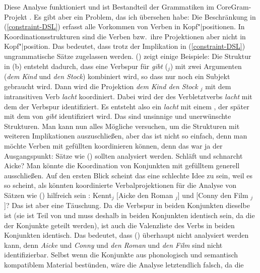 Diese Analyse funktioniert und ist Bestandteil der Grammatiken im CoreGram-Projekt
\citep{MuellerCoreGram}. Es gibt aber ein Problem, das ich übersehen habe: Die Beschränkung in
(\ref{constraint-DSL}) erfasst alle Vorkommen von Verben in Kopf"|positionen. In
Koordinationsstrukturen sind die Verben bzw.\ ihre Projektionen aber nicht in Kopf"|position. Das
bedeutet, dass trotz der Implikation in (\ref{constraint-DSL}) ungrammatische Sätze zugelassen
werden. () zeigt einige Beispiele:
\eal
\label{ex-Probleme bei zyklischen Verbspuren mit Koordination}
\zl
Die Struktur in (b) entsteht dadurch, dass eine Verbspur für \emph{gibt} (\trace$_j$) mit
zwei Argumenten (\emph{dem Kind} und \emph{den Stock}) kombiniert
wird, so dass nur noch ein Subjekt gebraucht wird. Dann wird die Projektion \emph{dem Kind den Stock
  \trace$_j$} mit dem intransitiven Verb \emph{lacht} koordiniert. Dabei wird der \dslw des
Verbletztverbs \emph{lacht} mit dem der Verbspur identifiziert. Es entsteht also ein \emph{lacht} mit einem
\dslw, der später mit dem \localw von \emph{gibt} identifiziert wird. Das sind unsinnige und unerwünschte
Strukturen. Man kann nun alles Mögliche versuchen, um die Strukturen mit weiteren Implikationen
auszuschließen, aber das ist nicht so einfach, denn man möchte Verben mit gefüllten \dslwen
koordinieren können, denn das war ja der Ausgangspunkt: Sätze wie () sollten analysiert werden.
\ea
Schläft und schnarcht Aicke?
\z
Man könnte die Koordination von Konjunkten mit gefülltem \dslw generell ausschließen. Auf den ersten
Blick scheint das eine schlechte Idee zu sein, weil es so scheint, als könnten koordinierte
Verbalprojektionen für die Analyse von Sätzen wie () hilfreich sein \parencites[Abschnitt~2]{Hoehle91}[6]{Frank94}:
\ea
\label{ex-Koordination-V1-als-ATB}
Kennt$_j$ [Aicke den Roman \trace$_j$] und [Conny den Film \trace$_j$]?
\z
Das ist aber eine Täuschung. Da die Verbspur in beiden Konjunkten dieselbe ist (sie ist Teil von
\head und muss deshalb in beiden Konjunkten identisch sein, da die \catwe der Konjunkte geteilt
werden), ist auch die Valenzliste des Verbs in beiden Konjunkten identisch. Das bedeutet, dass ()
überhaupt nicht analysiert werden kann, denn \emph{Aicke} und \emph{Conny} und \emph{den Roman} und
\emph{den Film} sind nicht identifizierbar. Selbst wenn die Konjunkte aus phonologisch und
semantisch kompatiblem Material bestünden, wäre die Analyse letztendlich falsch, da die
